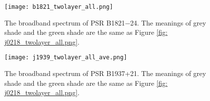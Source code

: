 \documentclass[a4paper, 12pt]{report}
\newcommand{\singleFig}[3]{
  \begin{figure}[!htp]
    \centering
    \texttt{[image: \#1]}
    \caption{#3}
    \label{fig: #1}
  \end{figure}
}
\begin{document}
    \vspace{0.5cm} 
    \begin{figure}[!htp]
      \centering 
      \texttt{[image: b1821\_twolayer\_all.png]}
      \caption[Broadband spectrum of PSR B1821$-$24.]
        {The broadband spectrum of PSR B1821$-$24. The meanings of grey shade and the green 
        shade are the same as Figure \ref{fig: j0218_twolayer_all.png}.}
      \label{fig: b1821_twolayer_all.png}
    \end{figure}

    \vspace{0.5cm} 
      
    \begin{figure}[!htp]
      \centering 
      \texttt{[image: j1939\_twolayer\_all\_ave.png]}
      \caption[The broadband spectrum of PSR B1937+21.]
        {The broadband spectrum of PSR B1937+21. The meanings of grey shade and the green 
        shade are the same as Figure \ref{fig: j0218_twolayer_all.png}.}
      \label{fig: j1939_twolayer_all_ave.png}
    \end{figure}

    \vspace{0.5cm}        

  
\end{document}
